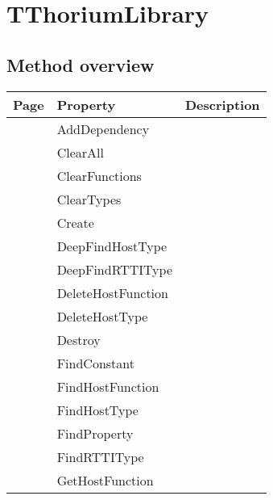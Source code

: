 \section{TThoriumLibrary}
\label{thoriumcore:thorium:tthoriumlibrary}
\subsection{Method overview}
\label{thoriumcore:thorium:tthoriumlibrary:methods}
\begin{tabularx}{\textwidth}{llX}
Page & Property & Description  \\ \hline
\pageref{thoriumcore:thorium:tthoriumlibrary:adddependency} & AddDependency  &  \\
\pageref{thoriumcore:thorium:tthoriumlibrary:clearall} & ClearAll  &  \\
\pageref{thoriumcore:thorium:tthoriumlibrary:clearfunctions} & ClearFunctions  &  \\
\pageref{thoriumcore:thorium:tthoriumlibrary:cleartypes} & ClearTypes  &  \\
\pageref{thoriumcore:thorium:tthoriumlibrary:create} & Create  &  \\
\pageref{thoriumcore:thorium:tthoriumlibrary:deepfindhosttype} & DeepFindHostType  &  \\
\pageref{thoriumcore:thorium:tthoriumlibrary:deepfindrttitype} & DeepFindRTTIType  &  \\
\pageref{thoriumcore:thorium:tthoriumlibrary:deletehostfunction} & DeleteHostFunction  &  \\
\pageref{thoriumcore:thorium:tthoriumlibrary:deletehosttype} & DeleteHostType  &  \\
\pageref{thoriumcore:thorium:tthoriumlibrary:destroy} & Destroy  &  \\
\pageref{thoriumcore:thorium:tthoriumlibrary:findconstant} & FindConstant  &  \\
\pageref{thoriumcore:thorium:tthoriumlibrary:findhostfunction} & FindHostFunction  &  \\
\pageref{thoriumcore:thorium:tthoriumlibrary:findhosttype} & FindHostType  &  \\
\pageref{thoriumcore:thorium:tthoriumlibrary:findproperty} & FindProperty  &  \\
\pageref{thoriumcore:thorium:tthoriumlibrary:findrttitype} & FindRTTIType  &  \\
\pageref{thoriumcore:thorium:tthoriumlibrary:gethostfunction} & GetHostFunction  &  \\

\end{tabularx}
